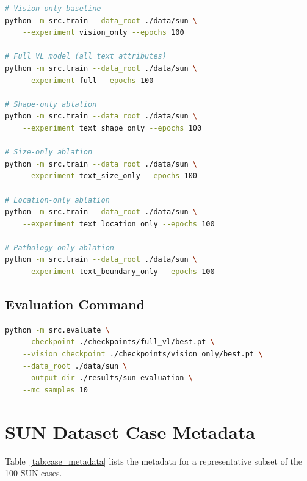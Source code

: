 \begin{lstlisting}[language=bash, caption={Training commands for all experimental configurations.}, label={lst:train_commands}]
# Vision-only baseline
python -m src.train --data_root ./data/sun \
    --experiment vision_only --epochs 100

# Full VL model (all text attributes)
python -m src.train --data_root ./data/sun \
    --experiment full --epochs 100

# Shape-only ablation
python -m src.train --data_root ./data/sun \
    --experiment text_shape_only --epochs 100

# Size-only ablation
python -m src.train --data_root ./data/sun \
    --experiment text_size_only --epochs 100

# Location-only ablation
python -m src.train --data_root ./data/sun \
    --experiment text_location_only --epochs 100

# Pathology-only ablation
python -m src.train --data_root ./data/sun \
    --experiment text_boundary_only --epochs 100
\end{lstlisting}

\subsection{Evaluation Command}

\begin{lstlisting}[language=bash, caption={Evaluation command for paired model comparison.}, label={lst:eval_command}]
python -m src.evaluate \
    --checkpoint ./checkpoints/full_vl/best.pt \
    --vision_checkpoint ./checkpoints/vision_only/best.pt \
    --data_root ./data/sun \
    --output_dir ./results/sun_evaluation \
    --mc_samples 10
\end{lstlisting}


\section{SUN Dataset Case Metadata}
\label{sec:app:metadata}

Table~\ref{tab:case_metadata} lists the metadata for a representative subset of the 100 SUN cases.

